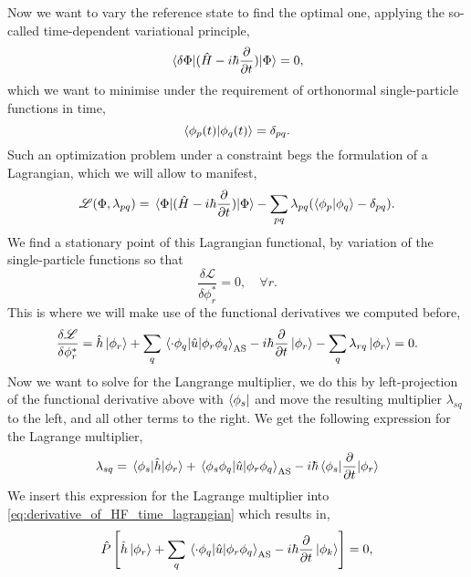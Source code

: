 Now we want to vary the reference state to find the optimal one, 
applying the so-called time-dependent variational principle\cite{dirac1930principles},
\begin{equation}
    \mel{\delta\Phi}{(\hat{H} - i\hbar\frac{\partial}{\partial t})}{\Phi} = 0,
\end{equation}
which we want to minimise under the requirement of orthonormal single-particle functions
in time,
\begin{equation}
    \braket{\phi_p(t)}{\phi_q(t)} = \delta_{pq}.
\end{equation}
Such an optimization problem under a constraint begs the formulation of a Lagrangian,
which we will allow to manifest,
\begin{equation}
    \mathscr{L}(\Phi, \lambda_{pq}) = 
        \mel{\Phi}{(\hat{H} - i\hbar\frac{\partial}{\partial t})}{\Phi}
        - \sum_{pq} \lambda_{pq} (\braket{\phi_p}{\phi_q} - \delta_{pq}).
\end{equation}
We find a stationary point of this Lagrangian functional, by variation of the single-particle 
functions so that 
\begin{equation}
    \frac{\delta\mathscr{L}}{\delta \phi_r^*} = 0, \quad \forall r.
\end{equation}
This is where we will make use of the functional derivatives we computed before,
\begin{equation}
    \label{eq:derivative_of_HF_time_lagrangian}
    \frac{\delta\mathscr{L}}{\delta \phi_r^*}
    = \hat{h}\ket{\phi_r} 
        + \sum_q\mel{\cdot\phi_q}{\hat{u}}{\phi_r\phi_q}_\text{AS}
        - i\hbar\frac{\partial}{\partial t} \ket{\phi_r}
        - \sum_q \lambda_{rq} \ket{\phi_r} = 0.
\end{equation}
Now we want to solve for the Langrange multiplier, we do this by left-projection of the 
functional derivative above with $\bra{\phi_s}$ and move the resulting multiplier $\lambda_{sq}$
to the left, and all other terms to the right. We 
get the following expression for the Lagrange multiplier,
\begin{equation}
    \lambda_{sq} = \mel{\phi_s}{\hat{h}}{\phi_r} 
        + \mel{\phi_s\phi_q}{\hat{u}}{\phi_r\phi_q}_\text{AS}
        - i\hbar \mel{\phi_s}{\frac{\partial}{\partial t}}{\phi_r}
\end{equation}
We insert this expression for the Lagrange multiplier into \autoref{eq:derivative_of_HF_time_lagrangian}
which results in,
\begin{equation}
    \label{eq:projected_time_hf_eqn}
    \hat{P}\left[\hat{h}\ket{\phi_r}
        + \sum_q\mel{\cdot\phi_q}{\hat{u}}{\phi_r\phi_q}_\text{AS}
        - i\hbar\frac{\partial}{\partial t} \ket{\phi_k}\right] = 0,
\end{equation}
